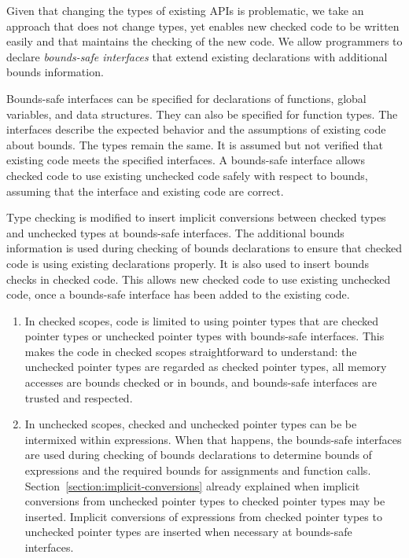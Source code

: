 Given that changing the types of existing APIs is problematic, we take an approach
that does not change types, yet enables new checked code to be written easily
and that maintains the checking of the new code.  We allow programmers to
declare {\em bounds-safe interfaces} that extend existing declarations with
additional bounds information.  

Bounds-safe interfaces can be 
specified for declarations of functions, global variables, and
data structures.  They can also be specified for function types.
The interfaces describe the expected behavior and the assumptions
of existing code about bounds. The types remain the same.
It is assumed but not verified that existing code
meets the specified interfaces.  A bounds-safe interface allows
checked code to use existing unchecked code safely with respect
to bounds, assuming that the interface and existing code are
correct.

Type checking is modified to insert implicit conversions between
checked types and unchecked types at bounds-safe interfaces.
The additional bounds information is used during checking
of bounds declarations to ensure that checked code is
using existing declarations properly.  It is also used to insert
bounds checks in checked code.  This allows new checked code to
use existing unchecked code, once a bounds-safe interface has
been added to the existing code.
\begin{enumerate}
\item
  In checked scopes, code is limited to using pointer types that are 
  checked pointer types or unchecked pointer types with bounds-safe interfaces.
  This makes the code in checked scopes straightforward to understand:
  the unchecked pointer types are regarded as checked pointer types, all memory
  accesses are bounds checked or in bounds, and bounds-safe interfaces are trusted
  and respected.
\item
  In unchecked scopes, checked and unchecked pointer types can be
  be intermixed within expressions.  When that happens, the bounds-safe
  interfaces are used during checking of bounds declarations to determine
  bounds of expressions and the required bounds for assignments and function calls. 
  Section~\ref{section:implicit-conversions} already
  explained when implicit conversions from unchecked pointer types to checked pointer
  types may be inserted.   Implicit conversions of expressions 
  from checked pointer types to unchecked pointer types are inserted when
  necessary at bounds-safe interfaces.
\end{enumerate}


